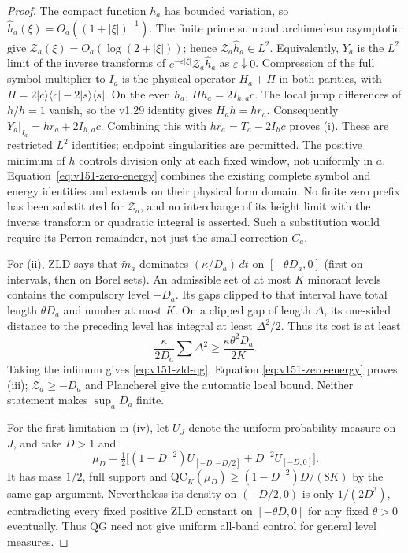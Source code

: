 \documentclass[11pt]{article}
\theoremstyle{remark}
\begin{document}
\begin{proof}
The compact function $h_a$ has bounded variation, so
$\widehat h_a(\xi)=O_a((1+|\xi|)^{-1})$. The finite prime sum and
archimedean asymptotic give
$\mathcal Z_a(\xi)=O_a(\log(2+|\xi|))$; hence
$\mathcal Z_a\widehat h_a\in L^2$. Equivalently, $Y_a$ is the
$L^2$ limit of the inverse transforms of
$e^{-\varepsilon|\xi|}\mathcal Z_a\widehat h_a$ as
$\varepsilon\downarrow0$.
Compression of the full symbol multiplier to $I_a$ is the physical
operator $H_a+\Pi$ in both parities, with
$\Pi=2|c\rangle\langle c|-2|s\rangle\langle s|$.
On the even $h_a$, $\Pi h_a=2I_{h,a}c$. The local jump differences
of $h/h=1$ vanish, so the v1.29 identity gives $H_a h=h r_a$.
Consequently $Y_a|_{I_a}=h r_a+2I_{h,a}c$. Combining this with
$h r_a=T_a-2I_hc$ proves (i). These are restricted $L^2$ identities;
endpoint singularities are permitted. The positive minimum of $h$
controls division only at each fixed window, not uniformly in $a$.
Equation~\eqref{eq:v151-zero-energy} combines the existing complete
symbol and energy identities and extends on their physical form domain.
No finite zero prefix has been substituted for $\mathcal Z_a$, and
no interchange of its height limit with the inverse transform or
quadratic integral is asserted. Such a substitution would require its
Perron remainder, not just the small correction $C_a$.

For (ii), ZLD says that $\widetilde m_a$ dominates
$(\kappa/D_a)\,dt$ on $[-\theta D_a,0]$ (first on intervals,
then on Borel sets). An admissible set of at most $K$ minorant levels
contains the compulsory level $-D_a$. Its gaps clipped to that interval
have total length $\theta D_a$ and number at most $K$. On a clipped
gap of length $\Delta$, its one-sided distance to the preceding
level has integral at least $\Delta^2/2$. Thus its cost is at least
\[
 \frac{\kappa}{2D_a}\sum\Delta^2
 \ge\frac{\kappa\theta^2D_a}{2K}.
\]
Taking the infimum gives \eqref{eq:v151-zld-qg}. Equation
\eqref{eq:v151-zero-energy} proves (iii); $\mathcal Z_a\ge-D_a$
and Plancherel give the automatic local bound. Neither statement
makes $\sup_aD_a$ finite.

For the first limitation in (iv), let $U_J$ denote the uniform
probability measure on $J$, and take $D>1$ and
\[
 \mu_D=\tfrac12\bigl[(1-D^{-2})U_{[-D,-D/2]}
                         +D^{-2}U_{[-D,0]}\bigr].
\]
It has mass $1/2$, full support and
$\mathrm{QC}_K(\mu_D)\ge(1-D^{-2})D/(8K)$ by the same gap
argument. Nevertheless its density on $(-D/2,0)$ is only
$1/(2D^3)$, contradicting every fixed positive ZLD constant on
$[-\theta D,0]$ for any fixed $\theta>0$ eventually. Thus QG need
not give uniform all-band control for general level measures.


\end{proof}
\end{document}
